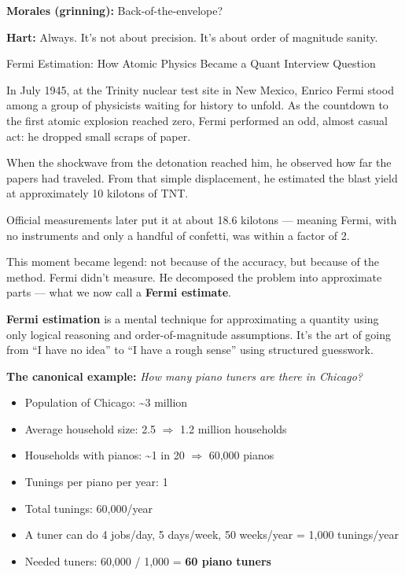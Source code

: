 \textbf{Morales (grinning):}  
Back-of-the-envelope?

\textbf{Hart:}  
Always. It’s not about precision. It’s about order of magnitude sanity.


\begin{HistoricalSidebar}{Fermi Estimation: How Atomic Physics Became a Quant Interview Question}

  In July 1945, at the Trinity nuclear test site in New Mexico, Enrico Fermi stood among a group of physicists waiting for 
  history to unfold.  
  As the countdown to the first atomic explosion reached zero, Fermi performed an odd, almost casual act: he dropped small 
  scraps of paper.
  
  \medskip
  
  When the shockwave from the detonation reached him, he observed how far the papers had traveled.  
  From that simple displacement, he estimated the blast yield at approximately 10 kilotons of TNT.
  
  \medskip
  
  Official measurements later put it at about 18.6 kilotons — meaning Fermi, with no instruments and only a handful of confetti, 
  was within a factor of 2.
  
  \medskip
  
  This moment became legend: not because of the accuracy, but because of the method.  
  Fermi didn’t measure. He decomposed the problem into approximate parts — what we now call a \textbf{Fermi estimate}.
  
  \medskip
  
  \textbf{Fermi estimation} is a mental technique for approximating a quantity using only logical reasoning and 
  order-of-magnitude assumptions.  
  It’s the art of going from ``I have no idea'' to ``I have a rough sense'' using structured guesswork.
  
  \medskip
  
  \textbf{The canonical example:}  
  \textit{How many piano tuners are there in Chicago?}

  \medskip
  
  \begin{itemize}
    \item Population of Chicago: \textasciitilde3 million  
    \item Average household size: 2.5 $\Rightarrow$ 1.2 million households  
    \item Households with pianos: \textasciitilde1 in 20 $\Rightarrow$ 60,000 pianos  
    \item Tunings per piano per year: 1  
    \item Total tunings: 60,000/year  
    \item A tuner can do 4 jobs/day, 5 days/week, 50 weeks/year = 1,000 tunings/year  
    \item Needed tuners: 60,000 / 1,000 = \textbf{60 piano tuners}
  \end{itemize}
  

\end{HistoricalSidebar}
